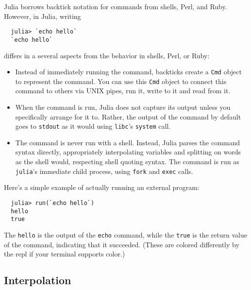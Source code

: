 \documentclass{article}
\begin{document}
Julia borrows backtick notation for commands from shells, Perl, and Ruby.
However, in Julia, writing
\begin{verbatim}
  julia> `echo hello`
  `echo hello`
\end{verbatim}
differs in a several aspects from the behavior in shells, Perl, or Ruby:
\begin{itemize}

\item Instead of immediately running the command, backticks create a \verb|Cmd| object to represent the command.
You can use this \verb|Cmd| object to connect this command to others via UNIX pipes, run it, write to it and read from it.

\item When the command is run, Julia does not capture its output unless you specifically arrange for it to.
Rather, the output of the command by default goes to \verb|stdout| as it would using \verb|libc|'s \verb|system| call.

\item The command is never run with a shell.
Instead, Julia parses the command syntax directly, appropriately interpolating variables and splitting on words as the shell would, respecting shell quoting syntax.
The command is run as \verb|julia|'s immediate child process, using \verb|fork| and \verb|exec| calls.

\end{itemize}
Here's a simple example of actually running an external program:
\begin{verbatim}
  julia> run(`echo hello`)
  hello
  true
\end{verbatim}
The \verb|hello| is the output of the \verb|echo| command, while the \verb|true| is the return value of the command, indicating that it succeeded.
(These are colored differently by the repl if your terminal supports color.)

\subsection{Interpolation}
\end{document}
